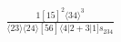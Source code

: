 \documentclass[varwidth, border=5pt]{standalone}
\begin{document}
\begin{my}
$\begin{gathered}
\scriptscriptstyle\frac{1[15]^2⟨34⟩^3}{⟨23⟩⟨24⟩[56]⟨4|2+3|1]s_{234}}
\end{gathered}$
\end{my}
\end{document}
